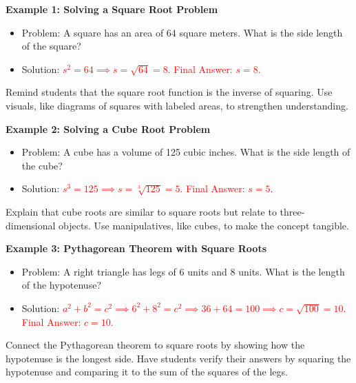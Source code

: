 \documentclass[12pt]{article}
\begin{document}
\begin{tcolorbox}[colframe=black!60, colback=white, 
coltitle=black, colbacktitle=black!15, fonttitle=\bfseries\Large, 
title=Examples, halign title=center, left=10pt, right=10pt, top=10pt, bottom=15pt]

\textbf{Example 1: Solving a Square Root Problem}
\begin{itemize}
    \item Problem: A square has an area of 64 square meters. What is the side length of the square?
    \item Solution: 
    \textcolor{red}{\(s^2 = 64 \implies s = \sqrt{64} = 8.\) Final Answer: \(s = 8\).}
\end{itemize}

{\color{blue} Remind students that the square root function is the inverse of squaring. Use visuals, like diagrams of squares with labeled areas, to strengthen understanding.}

\textbf{Example 2: Solving a Cube Root Problem}
\begin{itemize}
    \item Problem: A cube has a volume of 125 cubic inches. What is the side length of the cube?
    \item Solution: 
    \textcolor{red}{\(s^3 = 125 \implies s = \sqrt[3]{125} = 5.\) Final Answer: \(s = 5\).}
\end{itemize}

{\color{blue} Explain that cube roots are similar to square roots but relate to three-dimensional objects. Use manipulatives, like cubes, to make the concept tangible.}

\textbf{Example 3: Pythagorean Theorem with Square Roots}
\begin{itemize}
    \item Problem: A right triangle has legs of 6 units and 8 units. What is the length of the hypotenuse?
    \item Solution: 
    \textcolor{red}{\(a^2 + b^2 = c^2 \implies 6^2 + 8^2 = c^2 \implies 36 + 64 = 100 \implies c = \sqrt{100} = 10.\) Final Answer: \(c = 10\).}
\end{itemize}

{\color{blue} Connect the Pythagorean theorem to square roots by showing how the hypotenuse is the longest side. Have students verify their answers by squaring the hypotenuse and comparing it to the sum of the squares of the legs.}
\end{tcolorbox}

\vspace{1em}
\end{document}
